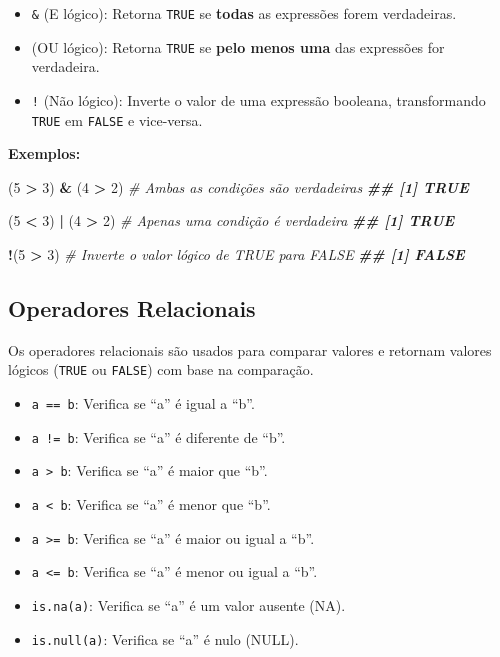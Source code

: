 \documentclass[
]{book}
\newenvironment{Shaded}{\begin{snugshade}}{\end{snugshade}}
\newcommand{\CommentTok}[1]{\textcolor[rgb]{0.56,0.35,0.01}{\textit{#1}}}
\newcommand{\DecValTok}[1]{\textcolor[rgb]{0.00,0.00,0.81}{#1}}
\newcommand{\DocumentationTok}[1]{\textcolor[rgb]{0.56,0.35,0.01}{\textbf{\textit{#1}}}}
\newcommand{\NormalTok}[1]{#1}
\newcommand{\SpecialCharTok}[1]{\textcolor[rgb]{0.81,0.36,0.00}{\textbf{#1}}}
\providecommand{\tightlist}{%
  \setlength{\itemsep}{0pt}\setlength{\parskip}{0pt}}
\begin{document}
\begin{itemize}
\item
  \texttt{\&} (E lógico): Retorna \texttt{TRUE} se \textbf{todas} as expressões forem
  verdadeiras.
\item
  \texttt{\textbar{}} (OU lógico): Retorna \texttt{TRUE} se \textbf{pelo menos uma} das expressões
  for verdadeira.
\item
  \texttt{!} (Não lógico): Inverte o valor de uma expressão booleana,
  transformando \texttt{TRUE} em \texttt{FALSE} e vice-versa.
\end{itemize}

\textbf{Exemplos:}

\begin{Shaded}
\begin{Highlighting}[]
\NormalTok{(}\DecValTok{5} \SpecialCharTok{\textgreater{}} \DecValTok{3}\NormalTok{) }\SpecialCharTok{\&}\NormalTok{ (}\DecValTok{4} \SpecialCharTok{\textgreater{}} \DecValTok{2}\NormalTok{)   }\CommentTok{\# Ambas as condições são verdadeiras}
\DocumentationTok{\#\# [1] TRUE}

\NormalTok{(}\DecValTok{5} \SpecialCharTok{\textless{}} \DecValTok{3}\NormalTok{) }\SpecialCharTok{|}\NormalTok{ (}\DecValTok{4} \SpecialCharTok{\textgreater{}} \DecValTok{2}\NormalTok{)   }\CommentTok{\# Apenas uma condição é verdadeira}
\DocumentationTok{\#\# [1] TRUE}

\SpecialCharTok{!}\NormalTok{(}\DecValTok{5} \SpecialCharTok{\textgreater{}} \DecValTok{3}\NormalTok{)            }\CommentTok{\# Inverte o valor lógico de TRUE para FALSE}
\DocumentationTok{\#\# [1] FALSE}
\end{Highlighting}
\end{Shaded}

\subsection{Operadores Relacionais}\label{operadores-relacionais}

Os operadores relacionais são usados para comparar valores e retornam
valores lógicos (\texttt{TRUE} ou \texttt{FALSE}) com base na comparação.

\begin{itemize}
\tightlist
\item
  \texttt{a\ ==\ b}: Verifica se ``a'' é igual a ``b''.
\item
  \texttt{a\ !=\ b}: Verifica se ``a'' é diferente de ``b''.
\item
  \texttt{a\ \textgreater{}\ b}: Verifica se ``a'' é maior que ``b''.
\item
  \texttt{a\ \textless{}\ b}: Verifica se ``a'' é menor que ``b''.
\item
  \texttt{a\ \textgreater{}=\ b}: Verifica se ``a'' é maior ou igual a ``b''.
\item
  \texttt{a\ \textless{}=\ b}: Verifica se ``a'' é menor ou igual a ``b''.
\item
  \texttt{is.na(a)}: Verifica se ``a'' é um valor ausente (NA).
\item
  \texttt{is.null(a)}: Verifica se ``a'' é nulo (NULL).
\end{itemize}
\end{document}
